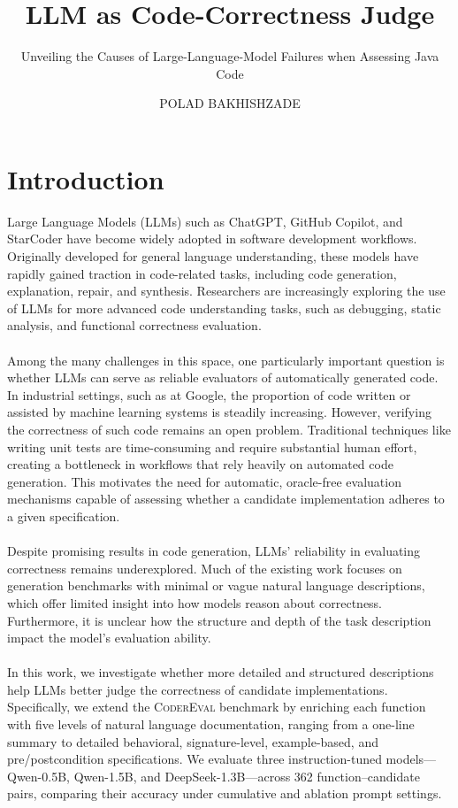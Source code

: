 \documentclass[a4paper]{usiinfbachelorproject}
\author{POLAD BAKHISHZADE}
\title{\textbf{LLM as Code-Correctness Judge}}
\subtitle{Unveiling the Causes of Large-Language-Model Failures when Assessing Java Code}
\begin{document}
\maketitle
\tableofcontents\newpage

\section{Introduction}\label{sec:intro}
Large Language Models (LLMs) such as ChatGPT, GitHub Copilot, and StarCoder have become widely adopted in software development workflows. Originally developed for general language understanding, these models have rapidly gained traction in code-related tasks, including code generation, explanation, repair, and synthesis. Researchers are increasingly exploring the use of LLMs for more advanced code understanding tasks, such as debugging, static analysis, and functional correctness evaluation.\\
\\[2pt]
Among the many challenges in this space, one particularly important question is whether LLMs can serve as reliable evaluators of automatically generated code. In industrial settings, such as at Google, the proportion of code written or assisted by machine learning systems is steadily increasing. However, verifying the correctness of such code remains an open problem. Traditional techniques like writing unit tests are time-consuming and require substantial human effort, creating a bottleneck in workflows that rely heavily on automated code generation. This motivates the need for automatic, oracle-free evaluation mechanisms capable of assessing whether a candidate implementation adheres to a given specification.\\
\\[2pt]
Despite promising results in code generation, LLMs’ reliability in evaluating correctness remains underexplored. Much of the existing work focuses on generation benchmarks with minimal or vague natural language descriptions, which offer limited insight into how models reason about correctness. Furthermore, it is unclear how the structure and depth of the task description impact the model’s evaluation ability.\\
\\[2pt]
In this work, we investigate whether more detailed and structured descriptions help LLMs better judge the correctness of candidate implementations. Specifically, we extend the \textsc{CoderEval} benchmark by enriching each function with five levels of natural language documentation, ranging from a one-line summary to detailed behavioral, signature-level, example-based, and pre/postcondition specifications. We evaluate three instruction-tuned models—Qwen-0.5B, Qwen-1.5B, and DeepSeek-1.3B—across 362 function–candidate pairs, comparing their accuracy under cumulative and ablation prompt settings.\\
\end{document}
